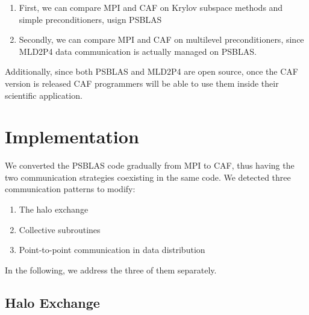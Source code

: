 \documentclass{IOS-Book-Article}
\begin{document}
\begin{enumerate}
\item First, we can compare MPI and CAF on Krylov subspace methods and simple preconditioners, usign PSBLAS
\item Secondly, we can compare MPI and CAF on multilevel preconditioners, since MLD2P4 data communication is actually managed on PSBLAS.
\end{enumerate}  

Additionally, since both PSBLAS and MLD2P4 are open source, once the CAF version is released CAF programmers will be able to use them inside their scientific application.

 
\section{Implementation}
We converted the PSBLAS code gradually from MPI to CAF, thus having the two communication strategies coexisting in the same code. 
We detected three communication patterns to modify:

\begin{enumerate}
\item The halo exchange
\item Collective subroutines
\item Point-to-point communication in data distribution
\end{enumerate}

In the following, we address the three of them separately.

\subsection{Halo Exchange}
\end{document}
